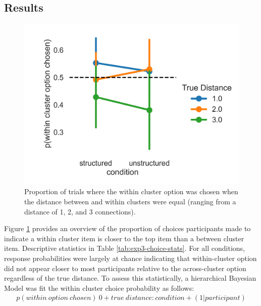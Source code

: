 \subsection{Results}

\begin{figure}
    \centering
    \includegraphics[width = \textwidth]{chapter_notebooks/chapter_3/figures/exp3_choice_results.png}
    \caption{Proportion of trials where the within cluster option was chosen when the distance between and within clusters were equal (ranging from a distance of 1, 2, and 3 connections).}
    \label{fig:exp3-choice-results}
\end{figure}


Figure \ref{fig:exp3-choice-results} provides an overview of the proportion of choices participants made to indicate a within cluster item is closer to the top item than a between cluster item. Descriptive statistics in Table \ref{tab:exp3-choice-stats}. \ac{For all conditions, response probabilities were largely at chance indicating that within-cluster option did not appear closer to most participants relative to the across-cluster option regardless of the true distance. To assess this statistically, a hierarchical Bayesian Model was fit the within cluster choice probability as follows:} 
\begin{equation}
    \begin{aligned}
        p(within\ option\ chosen) ~ 0 + true\ distance:condition + (1|participant)
    \end{aligned}
\end{equation}

